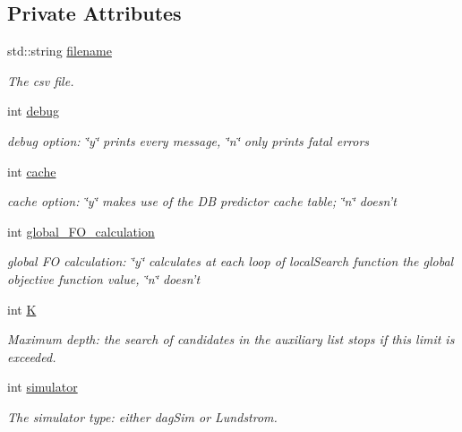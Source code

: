 \subsection*{Private Attributes}
\begin{DoxyCompactItemize}
\item 
std\-::string \hyperlink{classOpt__jr__parameters_aae2da456acbf5ac035faec6e01015714}{filename}
\begin{DoxyCompactList}\small\item\em The csv file. \end{DoxyCompactList}\item 
int \hyperlink{classOpt__jr__parameters_ae8241c7d0f75864365575e4be23037a3}{debug}
\begin{DoxyCompactList}\small\item\em debug option\-: \char`\"{}y\char`\"{} prints every message, \char`\"{}n\char`\"{} only prints fatal errors \end{DoxyCompactList}\item 
int \hyperlink{classOpt__jr__parameters_ad4061078141fd36321c49fa9105e11a5}{cache}
\begin{DoxyCompactList}\small\item\em cache option\-: \char`\"{}y\char`\"{} makes use of the D\-B predictor cache table; \char`\"{}n\char`\"{} doesn't \end{DoxyCompactList}\item 
int \hyperlink{classOpt__jr__parameters_adf939a159428f604a0d524bee1234bf2}{global\-\_\-\-F\-O\-\_\-calculation}
\begin{DoxyCompactList}\small\item\em global F\-O calculation\-: \char`\"{}y\char`\"{} calculates at each loop of local\-Search function the global objective function value, \char`\"{}n\char`\"{} doesn't \end{DoxyCompactList}\item 
int \hyperlink{classOpt__jr__parameters_a71e4771571a4466646cd1433b038b8da}{K}
\begin{DoxyCompactList}\small\item\em Maximum depth\-: the search of candidates in the auxiliary list stops if this limit is exceeded. \end{DoxyCompactList}\item 
int \hyperlink{classOpt__jr__parameters_a032e1532dc68ecb39b2f2129c0d81449}{simulator}
\begin{DoxyCompactList}\small\item\em The simulator type\-: either dag\-Sim or Lundstrom. \end{DoxyCompactList}\item 

\end{DoxyCompactItemize}

